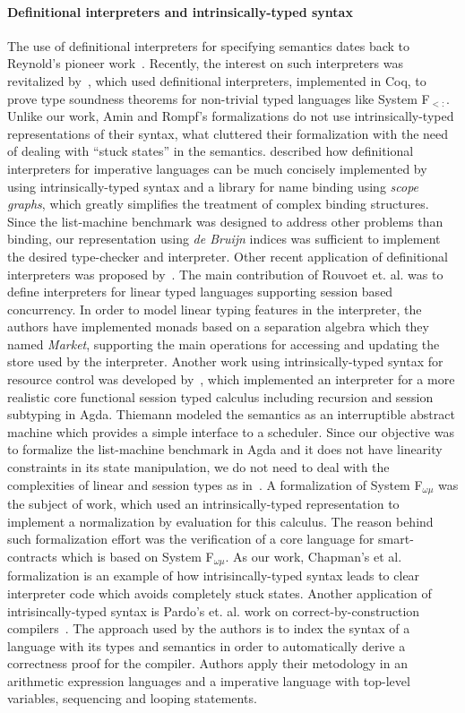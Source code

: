 \documentclass[review]{elsarticle}
\theoremstyle{definition}
\begin{document}
\paragraph{Definitional interpreters and intrinsically-typed syntax}{
The use of definitional interpreters for specifying semantics dates back to Reynold's pioneer work~\cite{Reynolds72}.
Recently, the interest on such interpreters was revitalized by~\cite{Amin17}, which used definitional
interpreters, implemented in Coq, to prove type soundness theorems for non-trivial typed languages like System F$_{<:}$.
Unlike our work, Amin and Rompf's formalizations do not use intrinsically-typed representations of their syntax, what cluttered
their formalization with the need of dealing with ``stuck states'' in the semantics. \cite{Poulsen18} described how
definitional interpreters for imperative languages can be much concisely implemented by using intrinsically-typed syntax and a
library for name binding using \emph{scope graphs}, which greatly simplifies the treatment of complex
binding structures. Since the list-machine benchmark was designed to address other problems than binding, our representation
using \emph{de Bruijn} indices was sufficient to implement the desired type-checker and interpreter.
Other recent application of definitional interpreters was proposed by~\cite{Rouvoet20}. The main contribution
of Rouvoet et. al. was to define interpreters for linear typed languages supporting session based concurrency. In order to model
linear typing features in the interpreter, the authors have implemented monads based on a separation algebra which they
named \emph{Market}, supporting the main operations for accessing and updating the store used by the interpreter.
Another work using intrinsically-typed syntax for resource control was developed by~\cite{Thiemann19}, which
implemented an interpreter for a more realistic core functional session typed calculus including recursion and
session subtyping in Agda. Thiemann modeled the semantics as an interruptible abstract machine which provides a
simple interface to a scheduler. Since our objective was to formalize the list-machine benchmark in Agda and it
does not have linearity constraints in its state manipulation, we do not need to deal with the complexities
of linear and session types as in~\cite{Rouvoet20,Thiemann19}. A formalization of System F$_{\omega\mu}$ was
the subject of \cite{ChapmanKNW19} work, which used an intrinsically-typed representation to
implement a normalization by evaluation for this calculus. The reason behind such formalization effort was
the verification of a core language for smart-contracts which is based on System F$_{\omega\mu}$. As our work,
Chapman's et al. formalization is an example of how intrisincally-typed syntax leads to clear interpreter code
which avoids completely stuck states. Another application of intrisincally-typed syntax is Pardo's et. al. work on correct-by-construction
compilers~\cite{PardoGPV18}. The approach used by the authors is to index the syntax of
a language with its types and semantics in order to automatically derive a correctness proof for the
compiler. Authors apply their metodology in an arithmetic expression languages and a imperative
language with top-level variables, sequencing and looping statements. }
\end{document}

